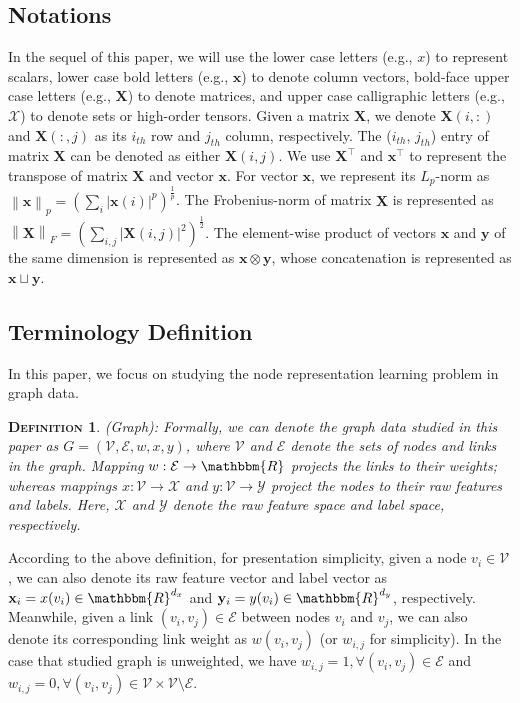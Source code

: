 \documentclass{article}
\newcommand{\mb}{\mathbf}
\newcommand{\mc}{\mathcal}
\newtheorem{definition}{\textsc{Definition}}
\begin{document}
\subsection{Notations}\label{subsec:notation}

In the sequel of this paper, we will use the lower case letters (e.g., $x$) to represent scalars, lower case bold letters (e.g., $\mb{x}$) to denote column vectors, bold-face upper case letters (e.g., $\mb{X}$) to denote matrices, and upper case calligraphic letters (e.g., $\mathcal{X}$) to denote sets or high-order tensors. Given a matrix $\mb{X}$, we denote $\mb{X}(i,:)$ and $\mb{X}(:,j)$ as its $i_{th}$ row and $j_{th}$ column, respectively. The ($i_{th}$, $j_{th}$) entry of matrix $\mb{X}$ can be denoted as either $\mb{X}(i,j)$. We use $\mb{X}^\top$ and $\mb{x}^\top$ to represent the transpose of matrix $\mb{X}$ and vector $\mb{x}$. For vector $\mb{x}$, we represent its $L_p$-norm as $\left\| \mb{x} \right\|_p = (\sum_i |\mb{x}(i)|^p)^{\frac{1}{p}}$. The Frobenius-norm of matrix $\mb{X}$ is represented as $\left\| \mb{X} \right\|_F = (\sum_{i,j} |\mb{X}(i,j)|^2)^{\frac{1}{2}}$. The element-wise product of vectors $\mb{x}$ and $\mb{y}$ of the same dimension is represented as $\mb{x} \otimes \mb{y}$, whose concatenation is represented as $\mb{x} \sqcup \mb{y}$.


\subsection{Terminology Definition}

In this paper, we focus on studying the node representation learning problem in graph data.

\begin{definition}
(Graph): Formally, we can denote the graph data studied in this paper as $G = (\mc{V}, \mc{E}, w, x, y)$, where $\mc{V}$ and $\mc{E}$ denote the sets of nodes and links in the graph. Mapping $w: \mc{E} \to \mathbbm{R}$ projects the links to their weights; whereas mappings $x: \mc{V} \to \mc{X}$ and $y: \mc{V} \to \mc{Y}$ project the nodes to their raw features and labels. Here, $\mc{X}$ and $\mc{Y}$ denote the raw feature space and label space, respectively.
\end{definition}

According to the above definition, for presentation simplicity, given a node $v_i \in \mc{V}$, we can also denote its raw feature vector and label vector as $\mb{x}_i = x(v_i) \in \mathbbm{R}^{d_x}$ and $\mb{y}_i = y(v_i)  \in \mathbbm{R}^{d_y}$, respectively. Meanwhile, given a link $(v_i, v_j) \in \mc{E}$ between nodes $v_i$ and $v_j$, we can also denote its corresponding link weight as $w(v_i, v_j)$ (or $w_{i,j}$ for simplicity). In the case that studied graph is unweighted, we have $w_{i,j} = 1, \forall (v_i, v_j) \in \mc{E}$ and $w_{i,j} = 0, \forall (v_i, v_j) \in \mc{V} \times \mc{V} \setminus \mc{E}$.
\end{document}
